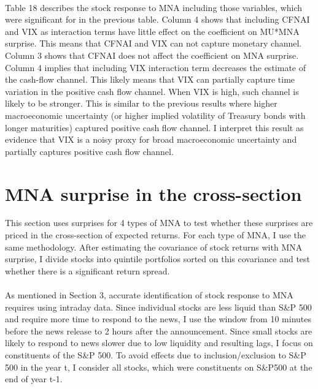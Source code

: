 \documentclass[12pt]{article}
\begin{document}
\paragraph{}
Table 18 describes the stock response to MNA including those variables, which were significant for in the previous table. Column 4 shows that including CFNAI and VIX as interaction terms have little effect on the coefficient on MU*MNA surprise. This means that CFNAI and VIX can not capture monetary channel. Column 3 shows that CFNAI does not affect the coefficient on MNA surprise. Column 4 implies that including VIX interaction term decreases the estimate of the cash-flow channel. This likely means that VIX can partially capture time variation in the positive cash flow channel. When VIX is high, such channel is likely to be stronger. This is similar to the previous results where higher macroeconomic uncertainty (or higher implied volatility of Treasury bonds with longer maturities) captured positive cash flow channel. I interpret this result as evidence that VIX is a noisy proxy for broad macroeconomic uncertainty and partially captures positive cash flow channel.








\section{MNA surprise in the cross-section} \label{sec:Model}

This section uses surprises for 4 types of MNA to test whether these surprises are priced in the cross-section of expected returns. For each type of MNA, I use the same methodology. After estimating the covariance of stock returns with MNA surprise, I divide stocks into quintile portfolios sorted on this covariance and test whether there is a significant return spread.
\paragraph{}
As mentioned in Section 3, accurate identification of stock response to MNA requires using intraday data. Since individual stocks are less liquid than S\&P 500 and require more time to respond to the news, I use the window from 10 minutes before the news release to 2 hours after the announcement. Since small stocks are likely to respond to news slower due to low liquidity and resulting lags, I focus on constituents of the S\&P 500. To avoid effects due to inclusion/exclusion to S\&P 500 in the year t, I consider all stocks, which were constituents on S\&P500 at the end of year t-1.
\end{document}
